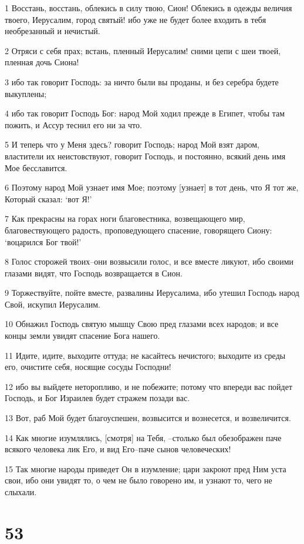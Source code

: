 \par 1 Восстань, восстань, облекись в силу твою, Сион! Облекись в одежды величия твоего, Иерусалим, город святый! ибо уже не будет более входить в тебя необрезанный и нечистый.
\par 2 Отряси с себя прах; встань, пленный Иерусалим! сними цепи с шеи твоей, пленная дочь Сиона!
\par 3 ибо так говорит Господь: за ничто были вы проданы, и без серебра будете выкуплены;
\par 4 ибо так говорит Господь Бог: народ Мой ходил прежде в Египет, чтобы там пожить, и Ассур теснил его ни за что.
\par 5 И теперь что у Меня здесь? говорит Господь; народ Мой взят даром, властители их неистовствуют, говорит Господь, и постоянно, всякий день имя Мое бесславится.
\par 6 Поэтому народ Мой узнает имя Мое; поэтому [узнает] в тот день, что Я тот же, Который сказал: `вот Я!'
\par 7 Как прекрасны на горах ноги благовестника, возвещающего мир, благовествующего радость, проповедующего спасение, говорящего Сиону: `воцарился Бог твой!'
\par 8 Голос сторожей твоих--они возвысили голос, и все вместе ликуют, ибо своими глазами видят, что Господь возвращается в Сион.
\par 9 Торжествуйте, пойте вместе, развалины Иерусалима, ибо утешил Господь народ Свой, искупил Иерусалим.
\par 10 Обнажил Господь святую мышцу Свою пред глазами всех народов; и все концы земли увидят спасение Бога нашего.
\par 11 Идите, идите, выходите оттуда; не касайтесь нечистого; выходите из среды его, очистите себя, носящие сосуды Господни!
\par 12 ибо вы выйдете неторопливо, и не побежите; потому что впереди вас пойдет Господь, и Бог Израилев будет стражем позади вас.
\par 13 Вот, раб Мой будет благоуспешен, возвысится и вознесется, и возвеличится.
\par 14 Как многие изумлялись, [смотря] на Тебя, --столько был обезображен паче всякого человека лик Его, и вид Его--паче сынов человеческих!
\par 15 Так многие народы приведет Он в изумление; цари закроют пред Ним уста свои, ибо они увидят то, о чем не было говорено им, и узнают то, чего не слыхали.

\chapter{53}

